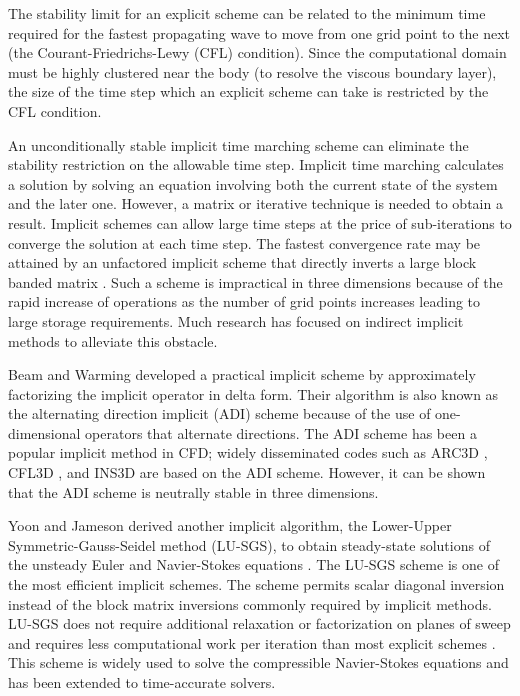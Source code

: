 \documentclass[conf]{new-aiaa}
\begin{document}
The stability limit for an explicit scheme can be related to the minimum time required for the fastest propagating wave to move from one grid point to the next (the Courant-Friedrichs-Lewy (CFL) condition). 
Since the computational domain must be highly clustered near the body (to resolve the viscous boundary layer), the size of the time step which an explicit scheme can take is restricted by the CFL condition.

An unconditionally stable implicit time marching scheme can eliminate the stability restriction on the allowable time step.
Implicit time marching calculates a solution by solving an equation involving both the current state of the system and the later one. 
However, a matrix or iterative technique is needed to obtain a result. 
Implicit schemes can allow large time steps \cite{A_Stable} at the price of sub-iterations to converge the solution at each time step.
The fastest convergence rate may be attained by an unfactored implicit scheme that directly inverts a large block banded matrix \cite{HixonImplicit}. 
Such a scheme is impractical in three dimensions because of the rapid increase of operations as the number of grid points increases leading to large storage requirements. 
Much research has focused on indirect implicit methods to alleviate this obstacle.

Beam and Warming \cite{Beam} developed a practical implicit scheme by approximately factorizing the implicit operator in delta form. 
Their algorithm is also known as the alternating direction implicit (ADI) scheme because of the use of one-dimensional operators that alternate directions. 
The ADI scheme has been a popular implicit method in CFD; 
widely disseminated codes such as ARC3D \cite{ARC3D}, CFL3D \cite{CFL3D}, and INS3D \cite{INS3D} are based on the ADI scheme.
However, it can be shown that the ADI scheme is neutrally stable in three dimensions. 

Yoon and Jameson derived another implicit algorithm, the Lower-Upper Symmetric-Gauss-Seidel method (LU-SGS), to obtain steady-state solutions of the unsteady Euler and Navier-Stokes equations \cite{LUSGS}.
The LU-SGS scheme is one of the most efficient implicit schemes. 
The scheme permits scalar diagonal inversion instead of the block matrix inversions commonly required by implicit methods.  
LU-SGS does not require additional relaxation or factorization on planes of sweep and requires less computational work per iteration than most explicit schemes \cite{YoonLUSGS}.
This scheme is widely used to solve the compressible Navier-Stokes equations and has been extended to time-accurate solvers. 
\end{document}
